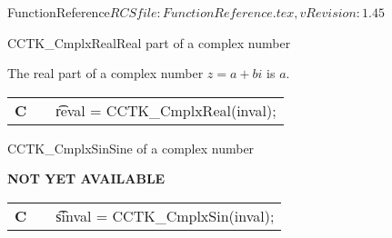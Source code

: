 \begin{cactuspart}{5}{FunctionReference}{$RCSfile: FunctionReference.tex,v $}{$Revision: 1.45 $}
\begin{CCTKFunc}{CCTK\_CmplxReal}{Real part of a complex number}
\label{CCTK-CmplxReal}
\showcargs
\begin{params}
\end{params}
\begin{discussion}
The real part of a complex number $z=a+bi$ is $a$.
\end{discussion}
\begin{examples}
\begin{tabular}{@{}p{3cm}cp{11cm}}
\hfill {\bf C} && {\t reval = CCTK\_CmplxReal(inval)};
\end{tabular}
\end{examples}
\begin{errorcodes}
\end{errorcodes}
\end{CCTKFunc}

\begin{CCTKFunc}{CCTK\_CmplxSin}{Sine of a complex number}
\label{CCTK-CmplxSin}
\showcargs
\begin{params}
\end{params}
\begin{discussion}
{\bf NOT YET AVAILABLE}
\end{discussion}
\begin{examples}
\begin{tabular}{@{}p{3cm}cp{11cm}}
\hfill {\bf C} && {\t sinval = CCTK\_CmplxSin(inval)};
\end{tabular}
\end{examples}
\begin{errorcodes}
\end{errorcodes}
\end{CCTKFunc}



\end{cactuspart}
